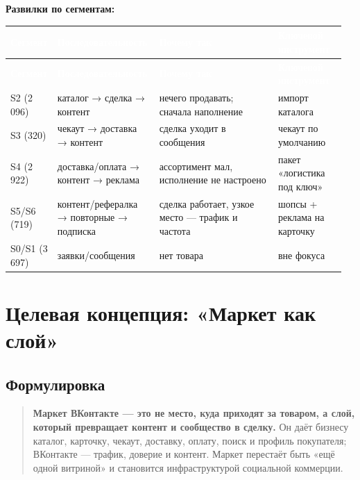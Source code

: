 \documentclass[10pt,a4paper]{article}
\begin{document}
\noindent\textbf{Развилки по сегментам:}\par\vspace{4pt}

\begingroup
\small
\setlength{\tabcolsep}{3pt}
\renewcommand{\arraystretch}{1.12}
\begin{longtable}{@{}>{\raggedright\arraybackslash}p{0.0994\linewidth}>{\raggedright\arraybackslash}p{0.3057\linewidth}>{\raggedright\arraybackslash}p{0.3516\linewidth}>{\raggedright\arraybackslash}p{0.2064\linewidth}@{}}
\rowcolor{blue}
\textcolor{white}{\textbf{Сегмент}} & \textcolor{white}{\textbf{Последовательность}} & \textcolor{white}{\textbf{Почему так}} & \textcolor{white}{\textbf{Ключевой инструмент}} \\
\endfirsthead
\rowcolor{blue}
\textcolor{white}{\textbf{Сегмент}} & \textcolor{white}{\textbf{Последовательность}} & \textcolor{white}{\textbf{Почему так}} & \textcolor{white}{\textbf{Ключевой инструмент}} \\
\endhead
\hline
S2 (2 096) & каталог → сделка → контент & нечего продавать; сначала наполнение & импорт каталога \\
S3 (320) & чекаут → доставка → контент & сделка уходит в сообщения & чекаут по умолчанию \\
S4 (2 922) & доставка/оплата → контент → реклама & ассортимент мал, исполнение не настроено & пакет «логистика под ключ» \\
S5/S6 (719) & контент/рефералка → повторные → подписка & сделка работает, узкое место — трафик и частота & шопсы + реклама на карточку \\
S0/S1 (3 697) & заявки/сообщения & нет товара & вне фокуса \\
\hline
\end{longtable}
\endgroup
\vspace{4pt}

\clearpage

\section{Целевая концепция: «Маркет как слой»}

\subsection{Формулировка}

\begin{quote}
\noindent\colorbox{soft}{\parbox{\dimexpr\linewidth-2\fboxsep}{
\raggedright \textbf{Маркет ВКонтакте — это не место, куда приходят за товаром, а слой, который превращает контент и сообщество в сделку.} Он даёт бизнесу каталог, карточку, чекаут, доставку, оплату, поиск и профиль покупателя; ВКонтакте — трафик, доверие и контент. Маркет перестаёт быть «ещё одной витриной» и становится инфраструктурой социальной коммерции.
}}
\end{quote}
\vspace{2pt}
\end{document}
